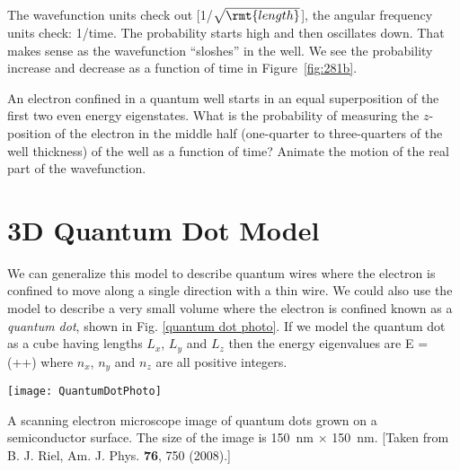 \begin{example}
\assess The wavefunction units check out [1/$\sqrt{\rmt{length}}$], the angular frequency units check: 1/time. The probability starts high and then oscillates down. That makes sense as the wavefunction ``sloshes'' in the well. We see the probability increase and decrease as a function of time in Figure~\ref{fig:281b}.
\begin{marginfigure}[-2cm]
\caption{ }
\label{fig:281b}
\end{marginfigure}

\end{example}

\begin{exercise}
An electron confined in a quantum well starts in an equal superposition of the first two even energy eigenstates. What is the probability of measuring the $z$-position of the electron in the middle half (\ie one-quarter to three-quarters of the well thickness) of the well as a function of time? Animate the motion of the real part of the wavefunction.

\end{exercise}

\section{3D Quantum Dot Model}

We can generalize this model to describe quantum wires where the electron is confined to move along a single direction with a thin wire. We could also use the model to describe a very small volume where the electron is confined known as a {\em quantum dot}, shown in Fig. \ref{quantum dot photo}. If we model the quantum dot as a cube having lengths $L_x$, $L_y$ and $L_z$ then the energy eigenvalues are
\beq
E = \left(++\right)
\eeq
where $n_x$, $n_y$ and $n_z$ are all positive integers.
\begin{marginfigure}
\centering
\texttt{[image: QuantumDotPhoto]} 
\caption{A scanning electron microscope image of quantum dots grown on a semiconductor surface.  The size of the image is 150~nm $\times$ 150~nm.  [Taken from B. J. Riel, Am. J. Phys. {\bf 76}, 750 (2008).]}
\label{quantum dot photo}
\end{marginfigure}

